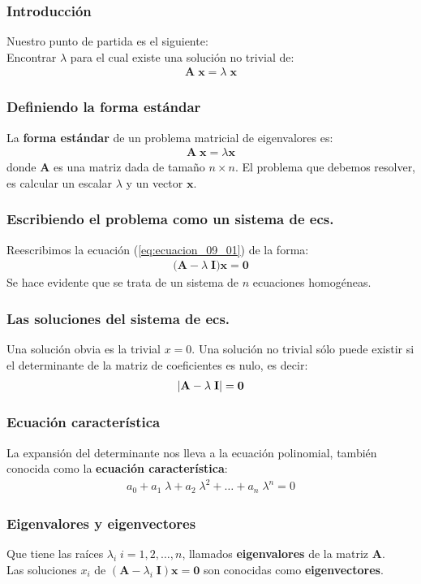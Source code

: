 \documentclass[12pt]{beamer}
\begin{document}
\begin{frame}
\frametitle{Introducción}
Nuestro punto de partida es el siguiente:
\\
\bigskip
\pause
Encontrar $\lambda$ para el cual existe una solución no trivial de:
\begin{align*}
\mathbf{A \; x} = \lambda \; \mathbf{x}
\end{align*}
\end{frame}
\begin{frame}
\frametitle{Definiendo la forma estándar}
La \textbf{\textcolor{lava}{forma estándar}} de un problema matricial de eigenvalores es:
\pause
\begin{align}
\mathbf{A \; x} = \lambda \mathbf{x}
\label{eq:ecuacion_09_01}
\end{align}
donde $\mathbf{A}$ es una matriz dada de tamaño $n \times n$. \pause El problema que debemos resolver, es calcular un escalar $\lambda$ y un vector $\mathbf{x}$.
\end{frame}
\begin{frame}
\frametitle{Escribiendo el problema como un sistema de ecs.}
Reescribimos la ecuación (\ref{eq:ecuacion_09_01}) de la forma:
\pause
\begin{align}
\big( \mathbf{A} - \lambda \; \mathbf{I} \big) \mathbf{x} = \mathbf{0}
\label{eq:ecuacion_09_02}
\end{align}
Se hace evidente que se trata de un sistema de $n$ ecuaciones homogéneas.
\end{frame}
\begin{frame}
\frametitle{Las soluciones del sistema de ecs.}
Una solución obvia es la trivial $x = 0$. \pause Una solución no trivial sólo puede existir si el determinante de la matriz de coeficientes es nulo, es decir:
\pause
\begin{align}
\abs{ \mathbf{A} - \lambda \; \mathbf{I} } = \mathbf{0}
\label{eq:ecuacion_09_03}
\end{align}
\end{frame}
\begin{frame}
\frametitle{Ecuación característica}
La expansión del determinante nos lleva a la ecuación polinomial, también conocida como la \textbf{\textcolor{ao}{ecuación característica}}:
\pause
\begin{align*}
a_{0} + a_{1} \; \lambda + a_{2} \; \lambda^{2} + \ldots + a_{n} \; \lambda^{n} = 0
\end{align*}
\end{frame}
\begin{frame}
\frametitle{Eigenvalores y eigenvectores}
Que tiene las raíces $\lambda_{i} \; i = 1, 2, \ldots,  n$, llamados \textbf{\textcolor{armygreen}{eigenvalores}} de la matriz $\mathbf{A}$.
\\
\medskip
\pause
Las soluciones $x_{i}$ de $(\mathbf{A}- \lambda_{i} \; \mathbf{I}) \mathbf{x} = \mathbf{0}$ son conocidas como \textbf{\textcolor{brickred}{eigenvectores}}.
\end{frame}
\end{document}
